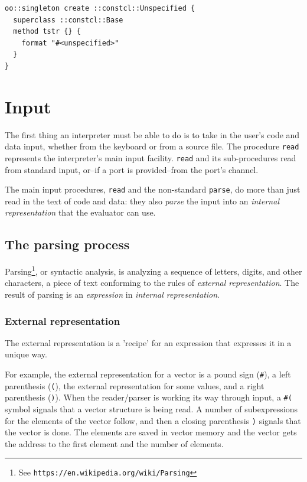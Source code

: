 \documentclass[twoside]{report}
\begin{document}
\begin{lstlisting}
oo::singleton create ::constcl::Unspecified {
  superclass ::constcl::Base
  method tstr {} {
    format "#<unspecified>"
  }
}
\end{lstlisting}

\chapter{Input}
\label{input}

The first thing an interpreter must be able to do is to take in the user's code and data input, whether from the keyboard or from a source file. The procedure \texttt{read} represents the interpreter's main input facility. \texttt{read} and its sub-procedures read from standard input, or--if a port is provided--from the port's channel.

The main input procedures, \texttt{read} and the non-standard \texttt{parse}, do more than just read in the text of code and data: they also \emph{parse} the input into an \emph{internal representation} that the evaluator can use.

\section{The parsing process}
\label{the-parsing-process}

Parsing\footnote{See \texttt{https://en.wikipedia.org/wiki/Parsing}}, or syntactic analysis, is analyzing a sequence of letters, digits, and other characters, a piece of text conforming to the rules of \emph{external representation}. The result of parsing is an \emph{expression} in \emph{internal representation}.

\subsection{External representation}
\label{external-representation}

The external representation is a 'recipe' for an expression that expresses it in a unique way.

For example, the external representation for a vector is a pound sign (\texttt{\#}), a left parenthesis (\texttt{(}), the external representation for some values, and a right parenthesis (\texttt{)}). When the reader/parser is working its way through input, a \texttt{\#(} symbol signals that a vector structure is being read. A number of subexpressions for the elements of the vector follow, and then a closing parenthesis \texttt{)} signals that the vector is done. The elements are saved in vector memory and the vector gets the address to the first element and the number of elements.
\end{document}
